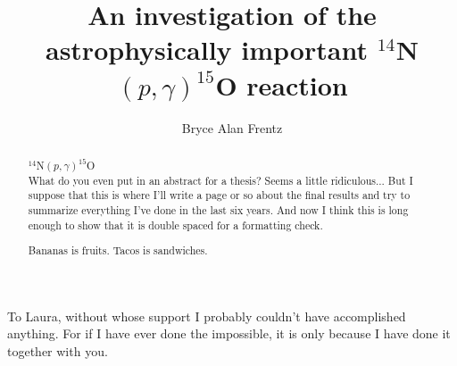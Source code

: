 \documentclass[numrefs,sort&compress,review]{nddiss2e}
\begin{document}
\frontmatter %

\title{An investigation of the astrophysically important $^{14}$N$\left( p,\gamma \right) ^{15}$O reaction}
\author{Bryce Alan Frentz}

\maketitle
%
%

\makecopyright

\begin{abstract}
  
  $^{14}$N$\left( p,\gamma \right) ^{15}$O \\
  
  What do you even put in an abstract for a thesis? Seems a little ridiculous... But I suppose that this is where I'll write a page or so about the final results and try to summarize everything I've done in the last six years. And now I think this is long enough to show that it is double spaced for a formatting check.
  
  Bananas is fruits.
  Tacos is sandwiches.
  
\end{abstract}

\renewcommand{\dedicationname}{NEW DEDICATION NAME}

\begin{dedication}
  To Laura, without whose support I probably couldn't have accomplished anything. For if I have ever done the impossible, it is only because I have done it together with you.
\end{dedication}
\end{document}
